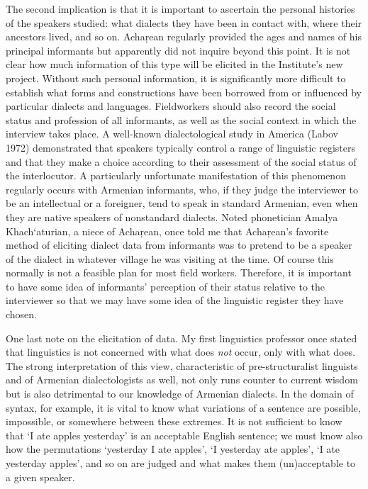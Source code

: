 \begin{exe}
The second implication is that it is important to ascertain the personal histories of the speakers studied: what dialects they have been in contact with, where their ancestors lived, and so on. Achaṛean regularly provided the ages and names of his principal informants but apparently did not inquire beyond this point. It is not clear how much information of this type will be elicited in the Institute’s new project. Without such personal information, it is significantly more difficult to establish what forms and constructions have been borrowed from or influenced by particular dialects and languages. Fieldworkers should also record the social status and profession of all informants, as well as the social context in which the interview takes place. A well-known dialectological study in America (Labov 1972) demonstrated that speakers typically control a range of linguistic registers and that they make a choice according to their assessment of the social status of the interlocutor. A particularly unfortunate manifestation of this phenomenon regularly occurs with Armenian informants, who, if they judge the interviewer to be an intellectual or a foreigner, tend to speak in standard Armenian, even when they are native speakers of nonstandard dialects. Noted phonetician Amalya  Khach‘aturian, a niece of Achaṛean, once told me that Achaṛean’s favorite method of eliciting dialect data from informants was to pretend to be a speaker of the dialect in whatever village he was visiting at the time. Of course this normally is not a feasible plan for most field workers. Therefore, it is important to have some idea of informants’ perception of their status relative to the interviewer so that we may have some idea of the linguistic register they have chosen.

One last note on the elicitation of data. My first linguistics professor once stated that linguistics is not concerned with what does \textit{not} occur, only with what does. The strong interpretation of this view, characteristic of pre-structuralist linguists and of Armenian dialectologists as well, not only runs counter to current wisdom but is also detrimental to our knowledge of Armenian dialects. In the domain of syntax, for example, it is vital to know what variations of a sentence are possible, impossible, or somewhere between these extremes. It is not sufficient to know that ‘I ate apples yesterday’ is an acceptable English sentence; we must know also how the permutations ‘yesterday I ate apples’, ‘I yesterday ate apples’, ‘I ate yesterday apples’, and so on are judged and what makes them (un)acceptable to a given speaker.


\end{exe}

